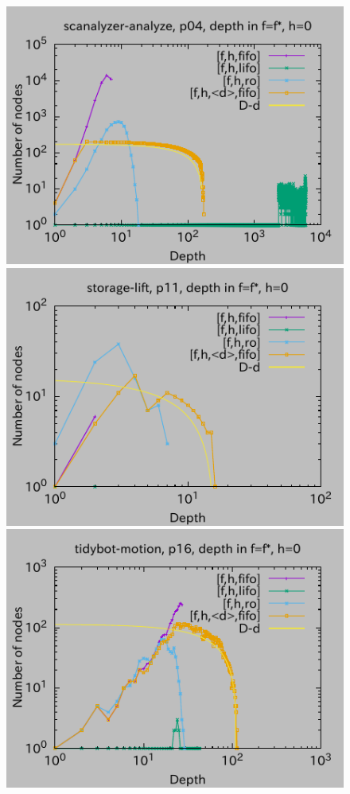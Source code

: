 \begin{figure}[htbp]
\includegraphics{img/depth/scanalyzer-analyze/p04.pdf}
\includegraphics{img/depth/storage-lift/p11.pdf}
\includegraphics{img/depth/tidybot-motion/p16.pdf}

\end{figure}
